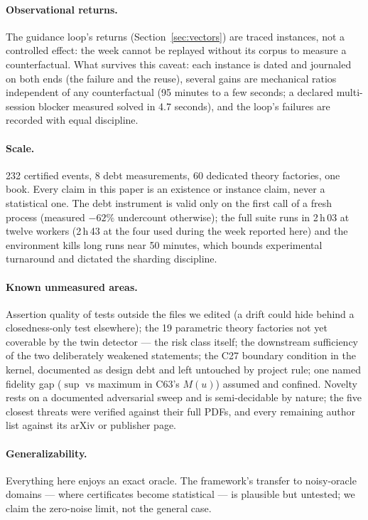 \documentclass[11pt]{article}
\theoremstyle{remark}\newtheorem{example}{Example}
\begin{document}
\paragraph{Observational returns.} The guidance loop's returns
(Section~\ref{sec:vectors}) are traced instances, not a controlled effect: the week
cannot be replayed without its corpus to measure a counterfactual. What survives this
caveat: each instance is dated and journaled on both ends (the failure and the reuse),
several gains are mechanical ratios independent of any counterfactual (95 minutes to
a few seconds; a declared multi-session blocker measured solved in 4.7 seconds), and
the loop's failures are recorded with equal discipline.

\paragraph{Scale.} 232 certified events, 8 debt measurements, 60 dedicated theory
factories, one book. Every claim in this paper is an existence or instance claim, never a
statistical one. The debt instrument is valid only on the first call of a fresh
process (measured $-62\%$ undercount otherwise); the full suite runs in
2\,h\,03 at twelve workers (2\,h\,43 at the four used during the week reported here)
and the environment kills long runs near 50 minutes, which bounds experimental
turnaround and dictated the sharding discipline.

\paragraph{Known unmeasured areas.} Assertion quality of tests outside the files we
edited (a drift could hide behind a closedness-only test elsewhere); the 19 parametric
theory factories not yet coverable by the twin detector --- the risk class itself; the
downstream sufficiency of the two deliberately weakened statements; the C27 boundary
condition in the kernel, documented as design debt and left untouched by project rule;
one named fidelity gap ($\sup$ vs maximum in C63's $M(u)$) assumed and confined.
Novelty rests on a documented adversarial sweep and is semi-decidable by nature; the
five closest threats were verified against their full PDFs, and every remaining author
list against its arXiv or publisher page.

\paragraph{Generalizability.} Everything here enjoys an exact oracle. The framework's
transfer to noisy-oracle domains --- where certificates become statistical --- is
plausible but untested; we claim the zero-noise limit, not the general case.
\end{document}
